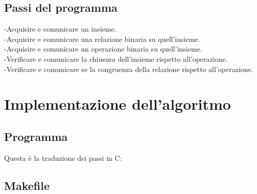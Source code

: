 \documentclass[11pt,a4paper,titlepage,block]{article}
\begin{document}
	\subsection{Passi del programma}
	-Acquisire e comunicare un insieme.\\
	-Acquisire e comunicare una relazione binaria su quell'insieme.\\
	-Acquisire e comunicare un operazione binaria su quell'insieme.\\
	-Verificare e comunicare la chiusura dell'insieme rispetto all'operazione.\\
	-Verificare e comunicare se la congruenza della relazione rispetto all'operazione.\\
	\newpage
	\section{Implementazione dell'algoritmo}
	\subsection{Programma}
	Questa è la traduzione dei passi in C:
	

	
\newpage
	\subsection{Makefile}


\newpage
\end{document}
